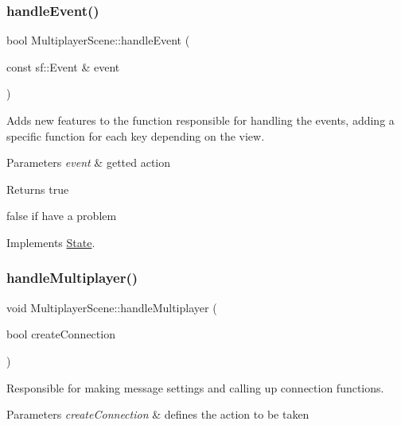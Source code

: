 \subsubsection{\texorpdfstring{handle\+Event()}{handleEvent()}}
{\footnotesize\ttfamily bool Multiplayer\+Scene\+::handle\+Event (\begin{DoxyParamCaption}\item[{const sf\+::\+Event \&}]{event }\end{DoxyParamCaption})\hspace{0.3cm}{\ttfamily [virtual]}}



Adds new features to the function responsible for handling the events, adding a specific function for each key depending on the view. 


\begin{DoxyParams}{Parameters}
{\em event} & getted action \\
\hline
\end{DoxyParams}
\begin{DoxyReturn}{Returns}
true 

false if have a problem 
\end{DoxyReturn}


Implements \hyperlink{classState_a19965f83460b248c42952aac8d001206}{State}.

\mbox{\label{classMultiplayerScene_afec1f9d6c9cf3e1bc9d6a2485bd4ed46}} 
\subsubsection{\texorpdfstring{handle\+Multiplayer()}{handleMultiplayer()}}
{\footnotesize\ttfamily void Multiplayer\+Scene\+::handle\+Multiplayer (\begin{DoxyParamCaption}\item[{bool}]{create\+Connection }\end{DoxyParamCaption})}



Responsible for making message settings and calling up connection functions. 


\begin{DoxyParams}{Parameters}
{\em create\+Connection} & defines the action to be taken \\
\hline
\end{DoxyParams}
\mbox{\label{classMultiplayerScene_a7d55178de89a4de08bdd1aaa7561756e}} 
